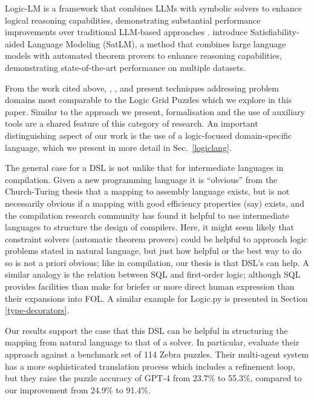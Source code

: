 Logic-LM is a framework that combines LLMs with symbolic solvers to enhance
logical reasoning capabilities, demonstrating substantial performance
improvements over traditional LLM-based approaches \cite{pan-etal-2023-logic}.
\cite{ye2023satlmsatisfiabilityaidedlanguagemodels} introduce
Satisfiability-aided Language Modeling (SatLM), a method that combines large
language models with automated theorem provers to enhance reasoning
capabilities, demonstrating state-of-the-art performance on multiple datasets.

From the work cited above, \cite{pan-etal-2023-logic},
\cite{ye2023satlmsatisfiabilityaidedlanguagemodels}, and
\cite{berman2024solvingzebrapuzzlesusing} present techniques addressing problem
domains most comparable to the Logic Grid Puzzles which we explore in this
paper. Similar to the approach we present, formalisation and the use of
auxiliary tools are a shared feature of this category of research. An important
distinguishing aspect of our work is the use of a logic-focused domain-specific
language, which we present in more detail in Sec.~\ref{logiclang}.

The general case for a DSL is not unlike that for intermediate languages in compilation. Given a new programming language it is ``obvious'' from the Church-Turing thesis that a mapping to assembly language exists, but is not necessarily obvious if a mapping with good efficiency properties (say) exists, and the compilation research community has found it helpful to use intermediate languages to structure the design of compilers. Here, it might seem likely that constraint solvers (automatic theorem provers) could be helpful to approach logic problems stated in natural language, but just how helpful or the best way to do so is not a priori obvious; like in compilation, our thesis is that DSL's can help. A similar analogy is the relation between SQL and first-order logic; although SQL provides facilities than make for briefer or more direct human expression than their expansions into FOL. A similar example for Logic.py is presented in Section \ref{type-decorators}.


Our results
support the case that this DSL can be helpful in structuring the mapping from natural language to that of a solver. In particular, \cite{berman2024solvingzebrapuzzlesusing} evaluate their
approach against a benchmark set of 114 Zebra puzzles. Their multi-agent system has a more sophisticated translation process which includes a refinement loop, but they
raise the puzzle accuracy of GPT-4 from 23.7\% to 55.3\%, compared to our
improvement from 24.9\% to 91.4\%.